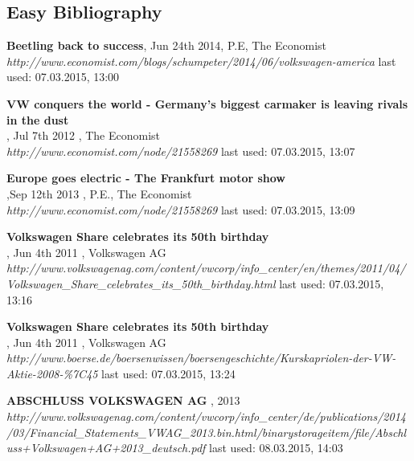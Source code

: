 \documentclass[12pt]{article}
\begin{document}
\subsection{Easy Bibliography}
\begin{thebibliography}{56}

  \textbf{Beetling back to success}, Jun 24th 2014, P.E, The Economist\\
  \textit{http://www.economist.com/blogs/schumpeter/2014/06/volkswagen-america}
  \newline last used: 07.03.2015, 13:00
  
   
  \textbf{VW conquers the world - Germany’s biggest carmaker is leaving rivals in the dust}\\, Jul 7th 2012 , The Economist\\
  \textit{  http://www.economist.com/node/21558269}
  \newline last used: 07.03.2015, 13:07
  
    
   
  \textbf{Europe goes electric - The Frankfurt motor show
}\\,Sep 12th 2013 , P.E., The Economist\\
  \textit{  http://www.economist.com/node/21558269}
  \newline last used: 07.03.2015, 13:09
  
  \textbf{Volkswagen Share celebrates its 50th birthday}\\, Jun 4th 2011 , Volkswagen AG\\
  \textit{http://www.volkswagenag.com/content/vwcorp/info\_center/en/themes/2011/04/Volkswagen\_Share\_celebrates\_its\_50th\_birthday.html
}
  \newline last used: 07.03.2015, 13:16
  
  \textbf{Volkswagen Share celebrates its 50th birthday}\\, Jun 4th 2011 , Volkswagen AG\\
  \textit{  http://www.boerse.de/boersenwissen/boersengeschichte/Kurskapriolen-der-VW-Aktie-2008-\%7C45}
  \newline last used: 07.03.2015, 13:24
  

  \textbf{ABSCHLUSS VOLKSWAGEN AG }, 2013 \\
  \textit{ http://www.volkswagenag.com/content/vwcorp/info\_center/de/publications/2014/03/Financial\_Statements\_VWAG\_2013.bin.html/binarystorageitem/file/Abschluss+Volkswagen+AG+2013\_deutsch.pdf  
}
  \newline last used: 08.03.2015, 14:03
    

\end{thebibliography}
\end{document}

